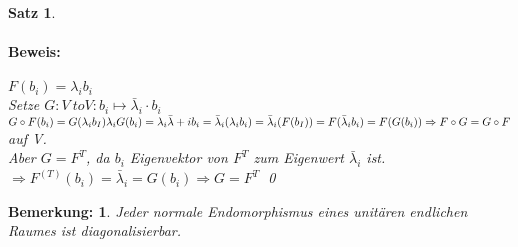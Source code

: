 \documentclass{report}
\newcommand{\lb}{\lambda}
\theoremstyle{customrem}
\newtheorem*{bemerkung}{Bemerkung\textnormal:}
\theoremstyle{customdef}
\newtheorem{satz}[definition]{Satz}
\renewenvironment{proof}{\paragraph{Beweis: }}{\qed}
\theoremstyle{customenv}
\begin{document}
\begin{satz}
\begin{proof}
{        \(F(b_i) = \lb_i b_i\)\\
        Setze \(G : V\ to V : b_i \mapsto \bar\lb_i \cdot b_i\)\\
        \(G \circ F(b_i) = G(\lb_i b_I) \lb_i G(b_i) = \lb_i \bar \lb+i b_i = \bar\lb_i(\lb_i b_i) = \bar\lb_i(F(b_I)) = F(\bar\lb_i b_i) = F(G(b_i))\\
        \Rightarrow F \circ G = G \circ F\) auf V.\\
        Aber \(G = F^T\), da \(b_i\) Eigenvektor von \(F^T\) zum Eigenwert
        \(\bar\lb_i\) ist.\\
        \(\Rightarrow F^(T)(b_i) = \bar\lb_i = G(b_i) \Rightarrow G = F^T\)
    }
  \end{proof}
\end{satz}

\begin{bemerkung} %
  Jeder normale Endomorphismus eines unit\"aren endlichen Raumes ist
  diagonalisierbar.
\end{bemerkung}

\newpage
\renewcommand{\listtheoremname}{Satz- und Definitionsverzeichnis}
\newpage
\printindex
\end{document}

